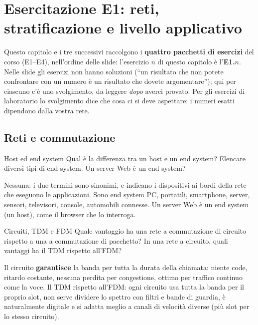 \chapter{Esercitazione E1: reti, stratificazione e livello applicativo}

Questo capitolo e i tre successivi raccolgono i \textbf{quattro pacchetti di esercizi} del corso (E1--E4), nell'ordine delle slide:
l'esercizio $n$ di questo capitolo è l'\textbf{E1.$n$}. Nelle slide gli esercizi non hanno soluzioni (``un risultato che non potete
confrontare con un numero è un risultato che dovete argomentare''); qui per ciascuno c'è uno svolgimento, da leggere \emph{dopo} averci
provato. Per gli esercizi di laboratorio lo svolgimento dice che cosa ci si deve aspettare: i numeri esatti dipendono dalla vostra rete.


\section{Reti e commutazione}

\begin{esercizio}{Host ed end system}
Qual è la differenza tra un host e un end system? Elencare diversi tipi di end system. Un server Web è un end system?

\svolgimento
Nessuna: i due termini sono sinonimi, e indicano i dispositivi ai bordi della rete che eseguono le applicazioni. Sono end system PC,
portatili, smartphone, server, sensori, televisori, console, automobili connesse. Un server Web è un end system (un host), come il
browser che lo interroga.
\end{esercizio}

\begin{esercizio}{Circuiti, TDM e FDM}
Quale vantaggio ha una rete a commutazione di circuito rispetto a una a commutazione di pacchetto? In una rete a circuito, quali
vantaggi ha il TDM rispetto all'FDM?

\svolgimento
Il circuito \textbf{garantisce} la banda per tutta la durata della chiamata: niente code, ritardo costante, nessuna perdita per
congestione, ottimo per traffico continuo come la voce. Il TDM rispetto all'FDM: ogni circuito usa tutta la banda per il proprio slot,
non serve dividere lo spettro con filtri e bande di guardia, è naturalmente digitale e si adatta meglio a canali di velocità diverse
(più slot per lo stesso circuito).
\end{esercizio}

